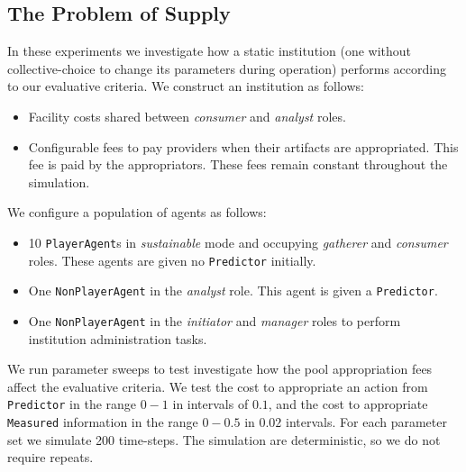 
\subsection{The Problem of Supply}\label{sec:supply}

In these experiments we investigate how a static institution (one without
collective-choice to change its parameters during operation) performs
according to our evaluative criteria. We construct an institution as follows:

\begin{itemize}
\item Facility costs shared between \emph{consumer} and \emph{analyst} roles.
\item Configurable fees to pay providers when their artifacts are appropriated. This fee is paid by the appropriators. These fees remain constant throughout the simulation.
\end{itemize}

We configure a population of agents as follows:

\begin{itemize}
\item 10 \texttt{PlayerAgent}s in \emph{sustainable} mode and occupying \emph{gatherer} and \emph{consumer} roles. These agents are given no \texttt{Predictor} initially.
\item One \texttt{NonPlayerAgent} in the \emph{analyst} role. This agent is given a \texttt{Predictor}.
\item One \texttt{NonPlayerAgent} in the \emph{initiator} and \emph{manager} roles to perform institution administration tasks.
\end{itemize}

We run parameter sweeps to test investigate how the pool appropriation fees
affect the evaluative criteria. We test the cost to appropriate an action from
\texttt{Predictor} in the range $0-1$ in intervals of $0.1$, and the cost to
appropriate \texttt{Measured} information in the range $0-0.5$ in $0.02$
intervals. For each parameter set we simulate 200 time-steps. The simulation
are deterministic, so we do not require repeats.

